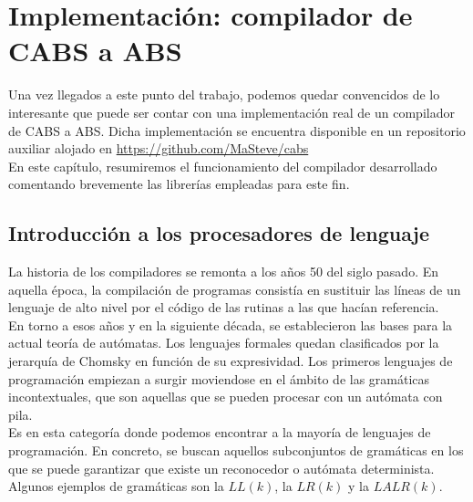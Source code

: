 \chapter{Implementación: compilador de CABS a ABS}

Una vez llegados a este punto del trabajo, podemos quedar convencidos de lo interesante que puede ser contar con una implementación real de un compilador de CABS a ABS. Dicha implementación se encuentra disponible en un repositorio auxiliar alojado en \url{https://github.com/MaSteve/cabs}\\

En este capítulo, resumiremos el funcionamiento del compilador desarrollado comentando brevemente las librerías empleadas para este fin.

\section{Introducción a los procesadores de lenguaje}

La historia de los compiladores se remonta a los años 50 del siglo pasado. En aquella época, la compilación de programas consistía en sustituir las líneas de un lenguaje de alto nivel por el código de las rutinas a las que hacían referencia.\\

En torno a esos años y en la siguiente década, se establecieron las bases para la actual teoría de autómatas. Los lenguajes formales quedan clasificados por la jerarquía de Chomsky en función de su expresividad. Los primeros lenguajes de programación empiezan a surgir moviendose en el ámbito de las gramáticas incontextuales, que son aquellas que se pueden procesar con un autómata con pila.\\

Es en esta categoría donde podemos encontrar a la mayoría de lenguajes de programación. En concreto, se buscan aquellos subconjuntos de gramáticas en los que se puede garantizar que existe un reconocedor o autómata determinista. Algunos ejemplos de gramáticas son la $LL(k)$, la $LR(k)$ y la $LALR(k)$.\\

